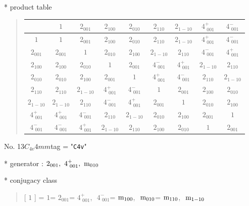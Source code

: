 \documentclass[fleqn,10pt,landscape]{jsarticle}
\begin{document}
* product table
\begin{quote}
\begin{tabular}{ccccccccc} \hline \hline
 & $ 1 $ & $ 2{}_{001} $ & $ 2{}_{100} $ & $ 2{}_{010} $ & $ 2{}_{110} $ & $ 2{}_{1-10} $ & $ 4^{+}_{\,\,001} $ & $ 4^{-}_{\,\,001} $ \\ \hline
$ 1 $ & $ 1 $ & $ 2{}_{001} $ & $ 2{}_{100} $ & $ 2{}_{010} $ & $ 2{}_{110} $ & $ 2{}_{1-10} $ & $ 4^{+}_{\,\,001} $ & $ 4^{-}_{\,\,001} $ \\
$ 2{}_{001} $ & $ 2{}_{001} $ & $ 1 $ & $ 2{}_{010} $ & $ 2{}_{100} $ & $ 2{}_{1-10} $ & $ 2{}_{110} $ & $ 4^{-}_{\,\,001} $ & $ 4^{+}_{\,\,001} $ \\
$ 2{}_{100} $ & $ 2{}_{100} $ & $ 2{}_{010} $ & $ 1 $ & $ 2{}_{001} $ & $ 4^{-}_{\,\,001} $ & $ 4^{+}_{\,\,001} $ & $ 2{}_{1-10} $ & $ 2{}_{110} $ \\
$ 2{}_{010} $ & $ 2{}_{010} $ & $ 2{}_{100} $ & $ 2{}_{001} $ & $ 1 $ & $ 4^{+}_{\,\,001} $ & $ 4^{-}_{\,\,001} $ & $ 2{}_{110} $ & $ 2{}_{1-10} $ \\
$ 2{}_{110} $ & $ 2{}_{110} $ & $ 2{}_{1-10} $ & $ 4^{+}_{\,\,001} $ & $ 4^{-}_{\,\,001} $ & $ 1 $ & $ 2{}_{001} $ & $ 2{}_{100} $ & $ 2{}_{010} $ \\
$ 2{}_{1-10} $ & $ 2{}_{1-10} $ & $ 2{}_{110} $ & $ 4^{-}_{\,\,001} $ & $ 4^{+}_{\,\,001} $ & $ 2{}_{001} $ & $ 1 $ & $ 2{}_{010} $ & $ 2{}_{100} $ \\
$ 4^{+}_{\,\,001} $ & $ 4^{+}_{\,\,001} $ & $ 4^{-}_{\,\,001} $ & $ 2{}_{110} $ & $ 2{}_{1-10} $ & $ 2{}_{010} $ & $ 2{}_{100} $ & $ 2{}_{001} $ & $ 1 $ \\
$ 4^{-}_{\,\,001} $ & $ 4^{-}_{\,\,001} $ & $ 4^{+}_{\,\,001} $ & $ 2{}_{1-10} $ & $ 2{}_{110} $ & $ 2{}_{100} $ & $ 2{}_{010} $ & $ 1 $ & $ 2{}_{001} $ \\
 \hline \hline
\end{tabular}
\end{quote}

\newpage

No. 13\quad$C_{4v}$\quad$4mm$\quad[ tetragonal ]
tag = "{\tt C4v}"

* generator : $2{}_{001},\,\,4^{+}_{\,\,001},\,\,{\rm m}_{010}$

* conjugacy class
\begin{quote}
[ $1$ ] = \quad $1$\newline[ $2{}_{001}$ ] = \quad $2{}_{001}$\newline[ $4^{+}_{\,\,001}$ ] = \quad $4^{+}_{\,\,001}$,\,\, $4^{-}_{\,\,001}$\newline[ ${\rm m}_{100}$ ] = \quad ${\rm m}_{100}$,\,\, ${\rm m}_{010}$\newline[ ${\rm m}_{110}$ ] = \quad ${\rm m}_{110}$,\,\, ${\rm m}_{1-10}$\newline
\end{quote}
\end{document}
